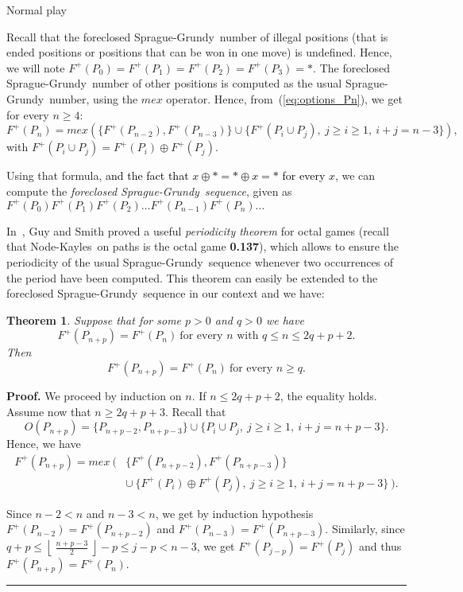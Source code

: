 \documentclass[11pt]{article}
\newcommand{\modif}[1]{\textcolor{black}{#1}}
\newcommand{\centre}[1]{\begin{center}#1\end{center}}
\newcommand{\NK}{Node-Kayles}
\newcommand{\SP}{Sprague-Grundy}
\newcommand{\nimsum}{\oplus}
\newcommand{\floor}[1]{\left\lfloor~#1~\right\rfloor}
\newtheorem{theorem}{Theorem}
\newcommand\qed{\mbox{}\hfill\rule{0.5em}{0.809em}\par\vskip 5mm}
\newenvironment{proof}[0]{\noindent\textbf{Proof.}}{\qed}
\begin{document}
\vskip 4mm

\centre{{\sc Normal play}}

Recall that the foreclosed \SP\ number of illegal positions (that is ended positions
or positions that can be won in one move) is undefined. Hence, we will note
$F^+(P_0)=F^+(P_1)=F^+(P_2)=F^+(P_3)=*$.
The foreclosed \SP\ number of other positions is computed as the usual \SP\ number,
using the $mex$ operator.
Hence, from~(\ref{eq:options_Pn}), we get for every $n\ge 4$:
$$F^+(P_n)=mex(\{F^+(P_{n-2}),F^+(P_{n-3})\}\cup
\{F^+(P_i\cup P_j),\ j\ge i\ge 1,\ i+j=n-3\}),$$
with $F^+(P_i\cup P_j)=F^+(P_i)\nimsum F^+(P_j)$.

Using that formula, 
\modif{and the fact that
$x\nimsum *=*\nimsum x=*$ for every $x$},
 we can compute the {\em foreclosed \SP\ sequence},
given as 
$F^+(P_0) F^+(P_1) F^+(P_2) \dots F^+(P_{n-1}) F^+(P_n) \dots\ $

In~\cite{GUY-SMITH-56}, Guy and Smith proved a useful {\em periodicity
theorem} for octal games (recall that \NK\ on paths is the octal game
{\bf 0.137}), which allows to ensure the periodicity of the usual
\SP\ sequence whenever two occurrences of the period have been computed.
This theorem can easily be extended to the foreclosed \SP\ sequence
in our context and we have:

\begin{theorem}
Suppose that for some $p>0$ and $q>0$ we have
$$F^+(P_{n+p})=F^+(P_n)\ \mbox{for every $n$ with $q\le n\le 2q+p+2$.}$$
Then
$$F^+(P_{n+p})=F^+(P_n)\ \mbox{for every $n\ge q$.}$$
\label{th:ddc_normal}
\end{theorem}

\begin{proof}
We proceed by induction on $n$. If $n\leq 2q+p+2$, the equality holds.
Assume now that $n\geq 2q+p+3$. Recall that
$$O(P_{n+p})=\{P_{n+p-2},P_{n+p-3}\} \cup
    \{P_i\cup P_j,\ j\ge i\ge 1,\ i+j=n+p-3\}.$$
Hence, we have
$$\begin{array}{rl}
F^+(P_{n+p})=mex\ ( & \{F^+(P_{n+p-2}),F^+(P_{n+p-3})\}\\
 & \cup\ \{F^+(P_i)\nimsum F^+(P_j),\ j\ge i\ge 1,\ i+j=n+p-3\}\ ).
 \end{array}$$

Since $n-2<n$ and $n-3<n$, we get by induction hypothesis
$F^+(P_{n-2})=F^+(P_{n+p-2})$ and
$F^+(P_{n-3})=F^+(P_{n+p-3})$.
Similarly, since $q+p\le\floor{\frac{n+p-3}{2}}-p\le j-p<n-3$, we get 
$F^+(P_{j-p})=F^+(P_j)$ and thus 
$F^+(P_{n+p})=F^+(P_n)$.
\end{proof}
\end{document}
